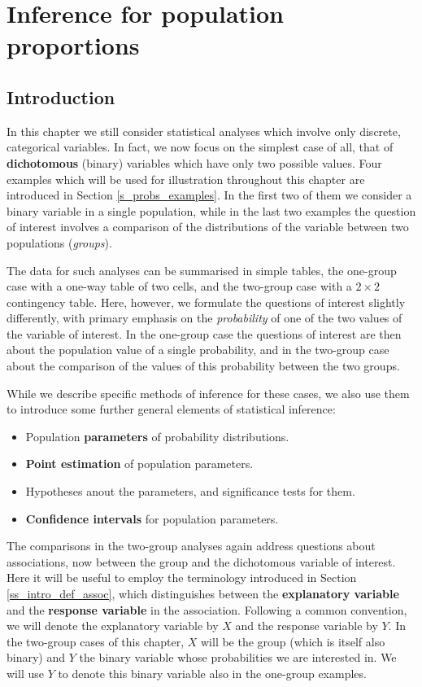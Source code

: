 \chapter{Inference for population proportions}
\label{c_probs}

\section{Introduction}
\label{s_probs_intro}

In this chapter we still consider statistical analyses which involve
only discrete, categorical variables. In fact, we now focus on the
simplest case of all, that of \textbf{dichotomous} (binary) variables
which have only two possible values. Four examples which will be used
for illustration throughout this chapter are introduced in Section
\ref{s_probs_examples}. In the first two of them we consider a
binary variable in a single population, while in the last two examples
the question of interest involves a comparison of the distributions of
the variable between two populations (\emph{groups}).

The data for such analyses can be summarised in simple tables, the
one-group case with a one-way table of two cells, and the two-group case
with a $2\times 2$ contingency table. Here, however, we formulate the
questions of interest slightly differently, with primary emphasis on the
\emph{probability} of one of the two values of the variable of interest. In the
one-group case the questions of interest are then about the population
value of a single probability, and in the two-group case about the
comparison of the values of this probability between the two groups.

While we describe specific methods of inference for these cases, we also
use them to introduce some further general elements of statistical
inference:
\begin{itemize}
\item
Population \textbf{parameters} of probability distributions.
\item
\textbf{Point estimation} of population parameters.
\item
Hypotheses anout the parameters, and significance tests
for them.
\item
\textbf{Confidence intervals} for population parameters.
\end{itemize}

The comparisons in the two-group analyses again address questions about
associations, now between the group and the dichotomous variable of
interest. Here it will be useful to employ the terminology
introduced in Section \ref{ss_intro_def_assoc}, which distinguishes
between the \textbf{explanatory variable} and the \textbf{response
variable} in the association. Following a common convention, we will
denote the explanatory variable by $X$ and the response variable by $Y$.
In the two-group cases of this chapter, $X$ will be the group (which is
itself also binary) and $Y$ the binary variable whose probabilities we
are interested in. We will use $Y$ to denote this binary variable also
in the one-group examples.


